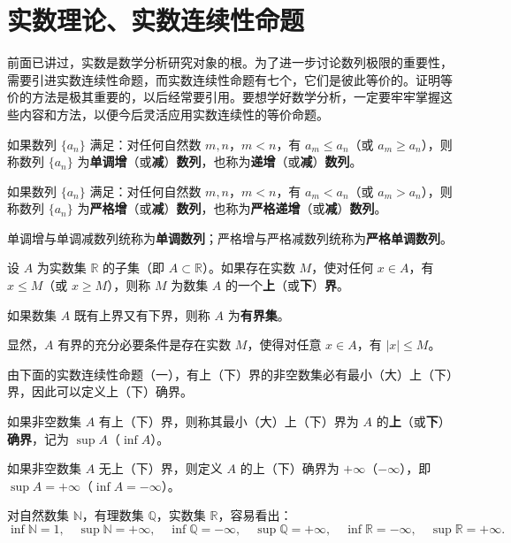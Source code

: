 \section{实数理论、实数连续性命题}\label{sec:1.3}

前面已讲过，实数是数学分析研究对象的根。为了进一步讨论数列极限的重要性，需要引进实数连续性命题，而实数连续性命题有七个，它们是彼此等价的。证明等价的方法是极其重要的，以后经常要引用。要想学好数学分析，一定要牢牢掌握这些内容和方法，以便今后灵活应用实数连续性的等价命题。

\begin{definition}\label{def:1.3.1}
如果数列 $\{a_{n}\}$ 满足：对任何自然数 $m, n$，$m < n$，有 $a_m \leqslant a_n$（或 $a_m \geqslant a_n$），则称数列 $\{a_n\}$ 为\textbf{单调增}（或\textbf{减}）\textbf{数列}，也称为\textbf{递增}（或\textbf{减}）\textbf{数列}。

如果数列 $\{a_{n}\}$ 满足：对任何自然数 $m, n$，$m < n$，有 $a_m < a_n$（或 $a_m > a_n$），则称数列 $\{a_n\}$ 为\textbf{严格增}（或\textbf{减}）\textbf{数列}，也称为\textbf{严格递增}（或\textbf{减}）\textbf{数列}。

单调增与单调减数列统称为\textbf{单调数列}；严格增与严格减数列统称为\textbf{严格单调数列}。
\end{definition}

\begin{definition}\label{def:1.3.2}
设 $A$ 为实数集 $\mathbb{R}$ 的子集（即 $A \subset \mathbb{R}$）。如果存在实数 $M$，使对任何 $x \in A$，有 $x \leqslant M$（或 $x \geqslant M$），则称 $M$ 为数集 $A$ 的一个\textbf{上}（或\textbf{下}）\textbf{界}。

如果数集 $A$ 既有上界又有下界，则称 $A$ 为\textbf{有界集}。

显然，$A$ 有界的充分必要条件是存在实数 $M$，使得对任意 $x \in A$，有 $|x| \leqslant M$。

由下面的实数连续性命题（一），有上（下）界的非空数集必有最小（大）上（下）界，因此可以定义上（下）确界。
\end{definition}

\begin{definition}\label{def:1.3.3}
如果非空数集 $A$ 有上（下）界，则称其最小（大）上（下）界为 $A$ 的\textbf{上}（或\textbf{下}）\textbf{确界}，记为 $\sup A$（$\inf A$）。

如果非空数集 $A$ 无上（下）界，则定义 $A$ 的上（下）确界为 $+\infty$（$-\infty$），即 $\sup A = +\infty$（$\inf A = -\infty$）。
\end{definition}

对自然数集 $\mathbb{N}$，有理数集 $\mathbb{Q}$，实数集 $\mathbb{R}$，容易看出：
\[
\inf \mathbb{N} = 1,\quad \sup \mathbb{N} = +\infty,\quad \inf \mathbb{Q} = -\infty,\quad \sup \mathbb{Q} = +\infty,\quad \inf \mathbb{R} = -\infty,\quad \sup \mathbb{R} = +\infty.
\]

